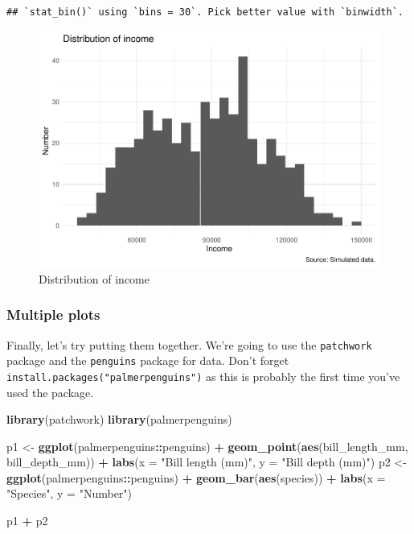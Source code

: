 \documentclass[
]{book}
\newenvironment{Shaded}{\begin{snugshade}}{\end{snugshade}}
\newcommand{\DataTypeTok}[1]{\textcolor[rgb]{0.13,0.29,0.53}{#1}}
\newcommand{\KeywordTok}[1]{\textcolor[rgb]{0.13,0.29,0.53}{\textbf{#1}}}
\newcommand{\NormalTok}[1]{#1}
\newcommand{\OperatorTok}[1]{\textcolor[rgb]{0.81,0.36,0.00}{\textbf{#1}}}
\newcommand{\StringTok}[1]{\textcolor[rgb]{0.31,0.60,0.02}{#1}}
\begin{document}
\begin{verbatim}
## `stat_bin()` using `bins = 30`. Pick better value with `binwidth`.
\end{verbatim}

\begin{figure}
\centering
\includegraphics{telling_stories_with_data_files/figure-latex/hisogramone-1.pdf}
\caption{\label{fig:hisogramone}Distribution of income}
\end{figure}

\hypertarget{multiple-plots}{%
\subsubsection{Multiple plots}\label{multiple-plots}}

Finally, let's try putting them together. We're going to use the \texttt{patchwork} package \citep{citepatchwork} and the \texttt{penguins} package for data. Don't forget \texttt{install.packages("palmerpenguins")} as this is probably the first time you've used the package.

\begin{Shaded}
\begin{Highlighting}[]
\KeywordTok{library}\NormalTok{(patchwork)}
\KeywordTok{library}\NormalTok{(palmerpenguins)}

\NormalTok{p1 <-}\StringTok{ }
\StringTok{  }\KeywordTok{ggplot}\NormalTok{(palmerpenguins}\OperatorTok{::}\NormalTok{penguins) }\OperatorTok{+}\StringTok{ }
\StringTok{  }\KeywordTok{geom_point}\NormalTok{(}\KeywordTok{aes}\NormalTok{(bill_length_mm, bill_depth_mm)) }\OperatorTok{+}
\StringTok{  }\KeywordTok{labs}\NormalTok{(}\DataTypeTok{x =} \StringTok{"Bill length (mm)"}\NormalTok{,}
       \DataTypeTok{y =} \StringTok{"Bill depth (mm)"}\NormalTok{)}
\NormalTok{p2 <-}\StringTok{ }
\StringTok{  }\KeywordTok{ggplot}\NormalTok{(palmerpenguins}\OperatorTok{::}\NormalTok{penguins) }\OperatorTok{+}\StringTok{ }
\StringTok{  }\KeywordTok{geom_bar}\NormalTok{(}\KeywordTok{aes}\NormalTok{(species)) }\OperatorTok{+}
\StringTok{  }\KeywordTok{labs}\NormalTok{(}\DataTypeTok{x =} \StringTok{"Species"}\NormalTok{,}
       \DataTypeTok{y =} \StringTok{"Number"}\NormalTok{)}

\NormalTok{p1 }\OperatorTok{+}\StringTok{ }\NormalTok{p2}
\end{Highlighting}
\end{Shaded}
\end{document}
